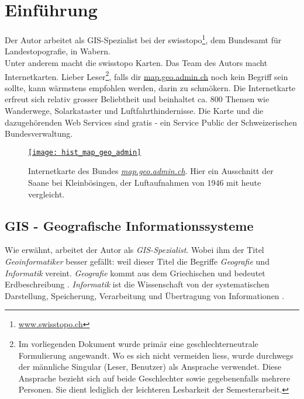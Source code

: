 \section{Einführung}
Der Autor arbeitet als GIS-Spezialist bei der swisstopo\footnote{\href{https://www.swisstopo.ch}{www.swisstopo.ch}}, dem Bundesamt für Landestopografie, in Wabern.\\ Unter anderem macht die swisstopo Karten. Das Team des Autors macht Internetkarten. Lieber Leser\footnote{Im vorliegenden Dokument wurde primär eine geschlechterneutrale Formulierung angewandt. Wo es sich nicht vermeiden liess, wurde durchwegs der männliche Singular (Leser, Benutzer) als Ansprache verwendet. Diese Ansprache bezieht sich auf beide Geschlechter sowie gegebenenfalls mehrere Personen. Sie dient lediglich der leichteren Lesbarkeit der Semesterarbeit.}, falls dir \href{https://map.geo.admin.ch}{map.geo.admin.ch} noch kein Begriff sein sollte, kann wärmstens empfohlen werden, darin zu schmökern. Die Internetkarte erfreut sich relativ grosser Beliebtheit und beinhaltet ca. 800 Themen wie Wanderwege, Solarkataster und Luftfahrthindernisse. Die Karte und die dazugehörenden Web Services sind gratis - ein Service Public der Schweizerischen Bundesverwaltung.

\begin{figure}[H]
	\centering
	\href{https://s.geo.admin.ch/8a82499889}{
	\texttt{[image: hist\_map\_geo\_admin]}}
	\caption{Internetkarte des Bundes \emph{\href{https://s.geo.admin.ch/8a82499889}{map.geo.admin.ch}}. Hier ein Ausschnitt der Saane bei Kleinbösingen, der Luftaufnahmen von 1946 mit heute vergleicht.}
	\label{fig:map.geo.admin.ch}
\end{figure}


\subsection{GIS - Geografische Informationssysteme}
Wie erwähnt, arbeitet der Autor als \emph{GIS-Spezialist}. Wobei ihm der Titel \emph{Geoinformatiker} besser gefällt: weil dieser Titel die Begriffe \emph{Geografie} und \emph{Informatik} vereint. \emph{Geografie} kommt aus dem Griechischen und bedeutet Erdbeschreibung \autocite[14]{Schertenleib2004}. \emph{Informatik} ist die Wissenschaft von der systematischen Darstellung, Speicherung, Verarbeitung und Übertragung von Informationen \cite{Informatik2010}.

